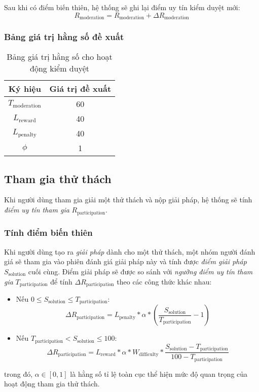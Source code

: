 Sau khi có điểm biến thiên, hệ thống sẽ ghi lại điểm uy tín kiểm duyệt mới:
\[R_{\text{moderation}} = R_{\text{moderation}} + \Delta R_{\text{moderation}}\]

\subsubsection{Bảng giá trị hằng số đề xuất}

\begin{table}[H]
  \centering
  \begin{tabular}{|c|c|}
    \hline
    \textbf{Ký hiệu}        & \textbf{Giá trị đề xuất} \\ \hline
    $T_{\text{moderation}}$ & 60                       \\ \hline
    $L_{\text{reward}}$     & 40                       \\ \hline
    $L_{\text{penalty}}$    & 40                       \\ \hline
    $\phi$                  & 1                        \\ \hline
  \end{tabular}
  \caption{Bảng giá trị hằng số cho hoạt động kiểm duyệt}
  \label{tab:suggested-constant-values-for-moderation}
\end{table}

\subsection{Tham gia thử thách}

Khi người dùng tham gia giải một thử thách và nộp giải pháp, hệ thống sẽ tính \textit{điểm uy tín tham gia} $R_{\text{participation}}$.

\subsubsection{Tính điểm biến thiên}

Khi người dùng tạo ra \textit{giải pháp} dành cho một thử thách, một nhóm người đánh giá sẽ tham gia vào phiên đánh giá giải pháp này và tính được \textit{điểm giải pháp} $S_{\text{solution}}$ cuối cùng.
Điểm giải pháp sẽ được so sánh với \textit{ngưỡng điểm uy tín tham gia} $T_{\text{participation}}$ để tính $\Delta R_{\text{participation}}$ theo các công thức khác nhau:

\begin{itemize}
  \item Nếu $0 \leq S_{\text{solution}} \leq  T_{\text{participation}}$:
        \[\Delta R_{\text{participation}} = L_{\text{penalty}} * \alpha * \left( \frac{S_{\text{solution}}}{T_{\text{participation}}}-1 \right)\]
  \item Nếu $T_{\text{participation}} < S_{\text{solution}} \leq 100$:
        \[\Delta R_{{\text{participation}}} = L_{\text{reward}} * \alpha*W_{\text{difficulty}} * \frac{S_{\text{solution}} - T_{\text{participation}}}{100-T_{\text{participation}}} \]
\end{itemize}
trong đó, $\alpha \in [0, 1]$ là hằng số tỉ lệ toàn cục thể hiện mức độ quan trọng của hoạt động tham gia thử thách.

